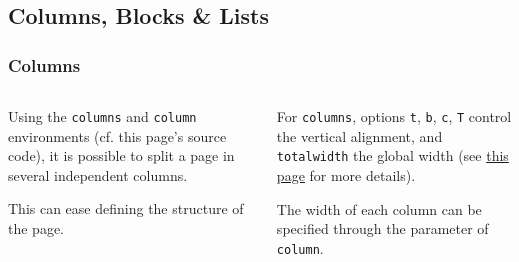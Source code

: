 \documentclass[10pt,    %
    english,            %
    xcolor=table,       %
    envcountsect,       %
    aspectratio=43      %
]{beamer}
\begin{document}
\subsection{Columns, Blocks \& Lists}
\begin{frame}
    \frametitle{Columns}
    
    \begin{columns}[T,totalwidth=\textwidth] %
        \begin{column}{0.33\textwidth}
            Using the \texttt{columns} and \texttt{column} environments (cf. this page's source code), it is possible to split a page in several independent columns. 
            
            This can ease defining the structure of the page.
        \end{column}
        
        \begin{column}{0.33\textwidth}
            For \texttt{columns}, options \texttt{t}, \texttt{b}, \texttt{c}, \texttt{T} control the vertical alignment, and \texttt{totalwidth} the global width (see \href{https://tex.stackexchange.com/a/51509/31360}{this page} for more details).
            
            The width of each column can be specified through the parameter of \texttt{column}.
        \end{column}
        

\end{columns}
\end{frame}
\end{document}
